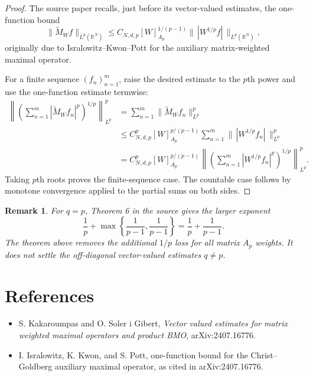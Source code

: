 \documentclass[11pt]{article}
\newtheorem{remark}{Remark}
\newcommand{\R}{\mathbb{R}}
\newcommand{\Lp}{L^p}
\newcommand{\MW}{\widetilde M_W}
\newcommand{\Ap}{A_p}
\begin{document}
\begin{proof}
The source paper recalls, just before its vector-valued estimates, the one-function bound
\[
 \|\MW f\|_{\Lp(\R^N)}
 \le C_{N,d,p}[W]_{\Ap}^{1/(p-1)}
 \|\,|W^{1/p}f|\,\|_{\Lp(\R^N)} ,
\]
originally due to Isralowitz--Kwon--Pott for the auxiliary matrix-weighted maximal operator.

For a finite sequence $(f_n)_{n=1}^m$, raise the desired estimate to the $p$th power and use the
one-function estimate termwise:
\[
\begin{aligned}
 \left\|\left(\sum_{n=1}^{m}|\MW f_n|^p\right)^{1/p}\right\|_{\Lp}^p
 &= \sum_{n=1}^{m} \|\MW f_n\|_{\Lp}^p \\
 &\le C_{N,d,p}^p [W]_{\Ap}^{p/(p-1)}
       \sum_{n=1}^{m}\|\,|W^{1/p}f_n|\,\|_{\Lp}^p \\
 &= C_{N,d,p}^p [W]_{\Ap}^{p/(p-1)}
 \left\|\left(\sum_{n=1}^{m}|W^{1/p}f_n|^p\right)^{1/p}\right\|_{\Lp}^p .
\end{aligned}
\]
Taking $p$th roots proves the finite-sequence case. The countable case follows by monotone
convergence applied to the partial sums on both sides.
\end{proof}

\begin{remark}
For $q=p$, Theorem 6 in the source gives the larger exponent
\[
 \frac1p+\max\left\{\frac1{p-1},\frac1{p-1}\right\}
 = \frac1p+\frac1{p-1}.
\]
The theorem above removes the additional $1/p$ loss for all matrix $\Ap$ weights. It does not settle the
off-diagonal vector-valued estimates $q\ne p$.
\end{remark}

\section*{References}

\begin{itemize}
\item S. Kakaroumpas and O. Soler i Gibert, \emph{Vector valued estimates for matrix weighted maximal operators and product BMO}, arXiv:2407.16776.
\item I. Isralowitz, K. Kwon, and S. Pott, one-function bound for the Christ--Goldberg auxiliary maximal operator, as cited in arXiv:2407.16776.
\end{itemize}
\end{document}
